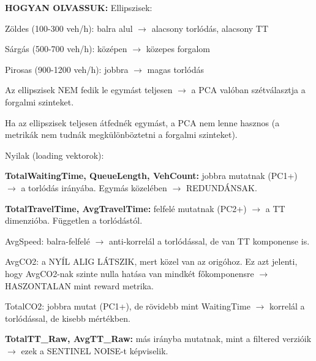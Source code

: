 \documentclass[11pt,a4paper]{article}
\begin{document}
\textbf{HOGYAN OLVASSUK:}
Ellipszisek:
\par\noindent\hspace*{1em}\textbullet{} Zöldes (100-300 veh/h): balra alul $\rightarrow$ alacsony torlódás, alacsony TT
\par\noindent\hspace*{1em}\textbullet{} Sárgás (500-700 veh/h): középen $\rightarrow$ közepes forgalom
\par\noindent\hspace*{1em}\textbullet{} Pirosas (900-1200 veh/h): jobbra $\rightarrow$ magas torlódás
\par\noindent\hspace*{1em}\textbullet{} Az ellipszisek NEM fedik le egymást teljesen $\rightarrow$ a PCA valóban
szétválasztja a forgalmi szinteket.
\par\noindent\hspace*{1em}\textbullet{} Ha az ellipszisek teljesen átfednék egymást, a PCA nem lenne
hasznos (a metrikák nem tudnák megkülönböztetni a forgalmi szinteket).

Nyilak (loading vektorok):
\par\noindent\hspace*{1em}\textbullet{} \textbf{TotalWaitingTime, QueueLength, VehCount:} jobbra mutatnak (PC1+)
$\rightarrow$ a torlódás irányába. Egymás közelében $\rightarrow$ REDUNDÁNSAK.
\par\noindent\hspace*{1em}\textbullet{} \textbf{TotalTravelTime, AvgTravelTime:} felfelé mutatnak (PC2+)
$\rightarrow$ a TT dimenzióba. Független a torlódástól.
\par\noindent\hspace*{1em}\textbullet{} AvgSpeed: balra-felfelé $\rightarrow$ anti-korrelál a torlódással, de van
TT komponense is.
\par\noindent\hspace*{1em}\textbullet{} AvgCO2: a NYÍL ALIG LÁTSZIK, mert közel van az origóhoz.
Ez azt jelenti, hogy AvgCO2-nak szinte nulla hatása van
mindkét főkomponensre $\rightarrow$ HASZONTALAN mint reward metrika.
\par\noindent\hspace*{1em}\textbullet{} TotalCO2: jobbra mutat (PC1+), de rövidebb mint WaitingTime
$\rightarrow$ korrelál a torlódással, de kisebb mértékben.
\par\noindent\hspace*{1em}\textbullet{} \textbf{TotalTT\_Raw, AvgTT\_Raw:} más irányba mutatnak, mint a filtered
verzióik $\rightarrow$ ezek a SENTINEL NOISE-t képviselik.
\end{document}
